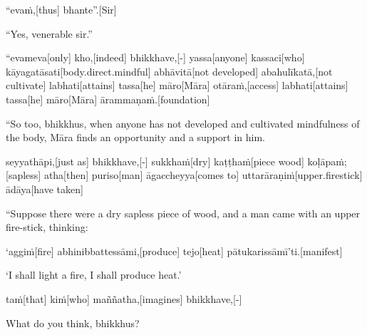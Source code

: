 \begin{samepage}
\begingl[glneveryline={\PaliGlossA,\PaliGlossB}]
“evaṁ,[thus] bhante”.[Sir]
\endgl
\nopagebreak
\linespread{0.5}
\begin{spacin}{0.2}
{\PaliGlossFT “Yes, venerable sir.”}
\end{spacin}
\vskip 12pt
\end{samepage}
\begin{samepage}
\begingl[glneveryline={\PaliGlossA,\PaliGlossB}]
“evameva[only] kho,[indeed] bhikkhave,[-] yassa[anyone] kassaci[who] kāyagatāsati[body.direct.mindful] abhāvitā[not developed] abahulīkatā,[not cultivate] labhati[attains] tassa[he] māro[Māra] otāraṁ,[access] labhati[attains] tassa[he] māro[Māra] ārammaṇaṁ.[foundation]
\endgl
\nopagebreak
\linespread{0.5}
\begin{spacin}{0.2}
{\PaliGlossFT “So too, bhikkhus, when anyone has not developed and cultivated mindfulness of the body, Māra finds an opportunity and a support in him.}
\end{spacin}
\vskip 12pt
\end{samepage}
\begin{samepage}
\begingl[glneveryline={\PaliGlossA,\PaliGlossB}]
seyyathāpi,[just as] bhikkhave,[-] sukkhaṁ[dry] kaṭṭhaṁ[piece wood] koḷāpaṁ;[sapless] atha[then] puriso[man] āgaccheyya[comes to] uttarāraṇiṁ[upper.firestick] ādāya[have taken]
\endgl
\nopagebreak
\linespread{0.5}
\begin{spacin}{0.2}
{\PaliGlossFT “Suppose there were a dry sapless piece of wood, and a man came with an upper fire-stick, thinking:}
\end{spacin}
\vskip 12pt
\end{samepage}
\begin{samepage}
\begingl[glneveryline={\PaliGlossA,\PaliGlossB}]
‘aggiṁ[fire] abhinibbattessāmi,[produce] tejo[heat] pātukarissāmī’ti.[manifest]
\endgl
\nopagebreak
\linespread{0.5}
\begin{spacin}{0.2}
{\PaliGlossFT ‘I shall light a fire, I shall produce heat.’}
\end{spacin}
\vskip 12pt
\end{samepage}
\begin{samepage}
\begingl[glneveryline={\PaliGlossA,\PaliGlossB}]
taṁ[that] kiṁ[who] maññatha,[imagines] bhikkhave,[-]
\endgl
\nopagebreak
\linespread{0.5}
\begin{spacin}{0.2}
{\PaliGlossFT What do you think, bhikkhus?}
\end{spacin}
\vskip 12pt
\end{samepage}
